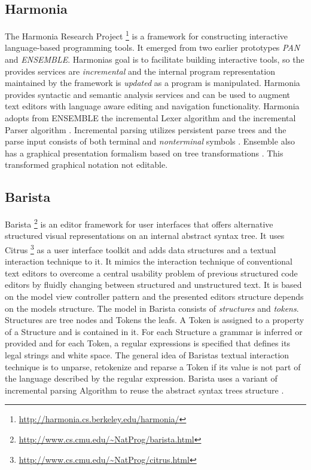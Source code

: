 \subsection{Harmonia}
The Harmonia Research Project \footnote{\raggedright \url{http://harmonia.cs.berkeley.edu/harmonia/}} is a framework for constructing interactive
language-based programming tools. It emerged from two earlier prototypes \emph{PAN} and \emph{ENSEMBLE}. Harmonias goal is to facilitate building interactive tools, so the provides services are \emph{incremental} and the internal program representation maintained by the framework is \emph{updated} as a program is manipulated. Harmonia provides syntactic and semantic analysis services \cite{harmonia} and can be used to augment text editors with language aware editing and navigation functionality. Harmonia adopts from ENSEMBLE the incremental Lexer algorithm \cite{ilex} and the incremental Parser algorithm \cite{iglrPaper}. Incremental parsing utilizes persistent parse trees and the parse input consists of both terminal and \emph{nonterminal} symbols \cite{iglrPaper}. Ensemble also has a graphical presentation formalism based on tree transformations \cite{ensemble}. This transformed graphical notation not editable.

\subsection{Barista}
Barista \footnote{\raggedright \url{http://www.cs.cmu.edu/~NatProg/barista.html}} is an editor framework for user interfaces that offers alternative structured visual representations on an internal abstract syntax tree. It uses Citrus \footnote{\raggedright \url{http://www.cs.cmu.edu/~NatProg/citrus.html}} as a user interface toolkit \cite{citrus} and adds data structures and a textual interaction technique to it. It mimics the interaction technique of conventional text editors to overcome a central usability problem of previous structured code editors by fluidly changing between structured and unstructured text. It is based on the model view controller pattern \cite{patterns} and the presented editors structure depends on the models structure. The model in Barista consists of \emph{structures} and \emph{tokens}. Structures are tree nodes and Tokens the leafs. A Token is assigned to a property of a Structure and is contained in it. For each Structure a grammar is inferred or provided and for each Token, a regular expressions is specified that defines its legal strings and white space. The general idea of Baristas textual interaction technique is to unparse, retokenize and reparse a Token if its value is not part of the language described by the regular expression. Barista uses a variant of \cite{iglrPaper} incremental parsing Algorithm to reuse the abstract syntax trees structure \cite{Barista}. 


